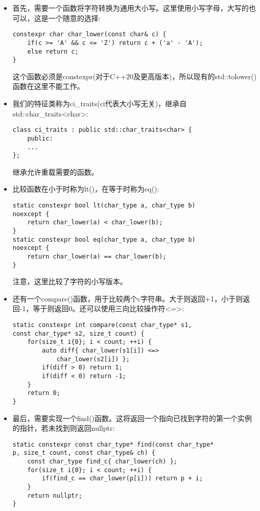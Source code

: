 \begin{itemize}
\item 
首先，需要一个函数将字符转换为通用大小写。这里使用小写字母，大写的也可以，这是一个随意的选择:

\begin{lstlisting}[style=styleCXX]
constexpr char char_lower(const char& c) {
	if(c >= 'A' && c <= 'Z') return c + ('a' - 'A');
	else return c;
}
\end{lstlisting}

这个函数必须是constexpr(对于C++20及更高版本)，所以现有的std::tolower()函数在这里不能工作。

\item 
我们的特征类称为ci\_traits(ci代表大小写无关)，继承自std::char\_traits<char>:

\begin{lstlisting}[style=styleCXX]
class ci_traits : public std::char_traits<char> {
	public:
	...
};
\end{lstlisting}

继承允许重载需要的函数。

\item 
比较函数在小于时称为lt()，在等于时称为eq():

\begin{lstlisting}[style=styleCXX]
static constexpr bool lt(char_type a, char_type b)
noexcept {
	return char_lower(a) < char_lower(b);
}
static constexpr bool eq(char_type a, char_type b)
noexcept {
	return char_lower(a) == char_lower(b);
}
\end{lstlisting}

注意，这里比较了字符的小写版本。

\item 
还有一个compare()函数，用于比较两个c字符串。大于则返回+1，小于则返回-1，等于则返回0。还可以使用三向比较操作符<=>:

\begin{lstlisting}[style=styleCXX]
static constexpr int compare(const char_type* s1,
const char_type* s2, size_t count) {
	for(size_t i{0}; i < count; ++i) {
		auto diff{ char_lower(s1[i]) <=>
			char_lower(s2[i]) };
		if(diff > 0) return 1;
		if(diff < 0) return -1;
	}
	return 0;
}
\end{lstlisting}

\item 
最后，需要实现一个find()函数。这将返回一个指向已找到字符的第一个实例的指针，若未找到则返回nullptr:

\begin{lstlisting}[style=styleCXX]
static constexpr const char_type* find(const char_type*
p, size_t count, const char_type& ch) {
	const char_type find_c{ char_lower(ch) };
	for(size_t i{0}; i < count; ++i) {
		if(find_c == char_lower(p[i])) return p + i;
	}
	return nullptr;
}
\end{lstlisting}


\end{itemize}
